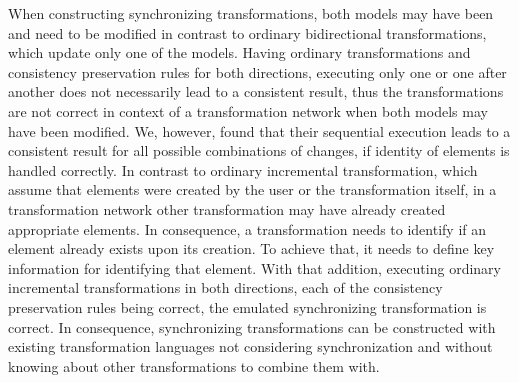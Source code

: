 \begin{insight}[Synchronization]
    When constructing synchronizing transformations, both models may have been and need to be modified in contrast to ordinary bidirectional transformations, which update only one of the models.
    Having ordinary transformations and consistency preservation rules for both directions, executing only one or one after another does not necessarily lead to a consistent result, thus the transformations are not correct in context of a transformation network when both models may have been modified.
    We, however, found that their sequential execution leads to a consistent result for all possible combinations of changes, if identity of elements is handled correctly.
    In contrast to ordinary incremental transformation, which assume that elements were created by the user or the transformation itself, in a transformation network other transformation may have already created appropriate elements.
    In consequence, a transformation needs to identify if an element already exists upon its creation.
    To achieve that, it needs to define key information for identifying that element.
    With that addition, executing ordinary incremental transformations in both directions, each of the consistency preservation rules being correct, the emulated synchronizing transformation is correct.
    In consequence, synchronizing transformations can be constructed with existing transformation languages not considering synchronization and without knowing about other transformations to combine them with.
\end{insight}

